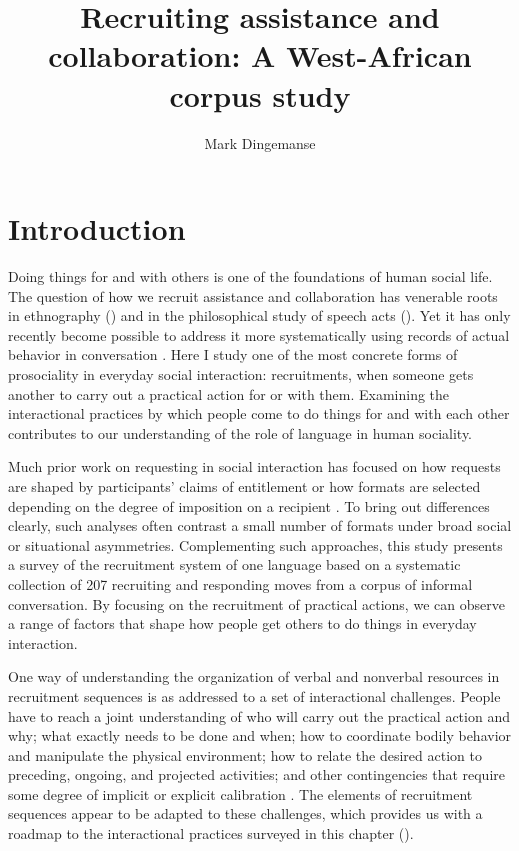 \documentclass[output=paper]{langsci/langscibook}
\author{Mark Dingemanse\affiliation{Centre for Language Studies, Radboud University}}
\title{Recruiting assistance and collaboration: {A} West-African corpus study}
\begin{document}
\section{Introduction}

Doing things for and with others is one of the foundations of human social life. The question of how we recruit assistance and collaboration has venerable roots in ethnography (\citealt{malinowski_problem_1923,frake_how_1964}) and in the philosophical study of speech acts (\citealt{austin_how_1962,searle_speech_1969}). Yet it has only recently become possible to address it more systematically using records of actual behavior in conversation \citep{drew2014requesting}. Here I study one of the most concrete forms of prosociality in everyday social interaction: recruitments, when someone gets another to carry out a practical action for or with them. Examining the interactional practices by which people come to do things for and with each other contributes to our understanding of the role of language in human sociality.

Much prior work on requesting in social interaction has focused on how requests are shaped by participants’ claims of entitlement \citep{heinemann_will_2006,curl_contingency_2008} or how formats are selected depending on the degree of imposition on a recipient \citep{brown_universals_1978,fukushima_request_1996}. To bring out differences clearly, such analyses often contrast a small number of formats under broad social or situational asymmetries. Complementing such approaches, this study presents a survey of the recruitment system of one language based on a systematic collection of 207 recruiting and responding moves from a corpus of informal conversation. By focusing on the recruitment of practical actions, we can observe a range of factors that shape how people get others to do things in everyday interaction.

One way of understanding the organization of verbal and nonverbal resources in recruitment sequences is as addressed to a set of interactional challenges. People have to reach a joint understanding of who will carry out the practical action and why; what exactly needs to be done and when; how to coordinate bodily behavior and manipulate the physical environment; how to relate the desired action to preceding, ongoing, and projected activities; and other contingencies that require some degree of implicit or explicit calibration \citep{clark_social_2006,goodwin_calibration_2013,enfield_human_2014}. The elements of recruitment sequences appear to be adapted to these challenges, which provides us with a roadmap to the interactional practices surveyed in this chapter ().
\end{document}
